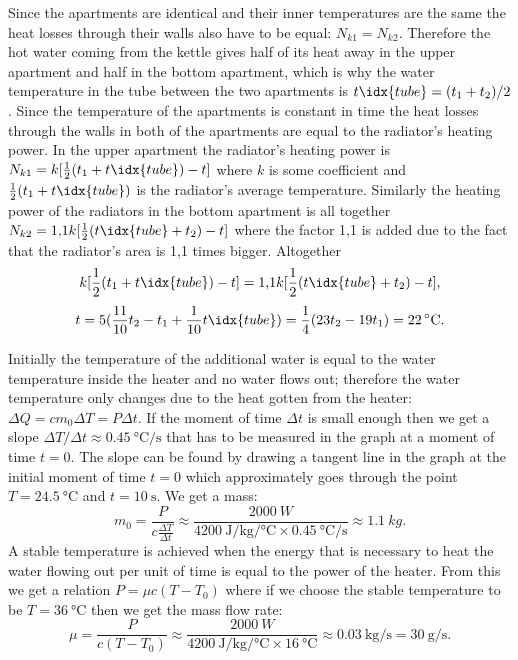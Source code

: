 \documentclass[11pt]{article}
\begin{document}
\solueng
Since the apartments are identical and their inner temperatures are the same the heat losses through their walls also have to be equal: $N_{k1}=N_{k2}$. Therefore the hot water coming from the kettle gives half of its heat away in the upper apartment and half in the bottom apartment, which is why the water temperature in the tube between the two apartments is $t\idx{tube}=(t_1+t_2)/2$. Since the temperature of the apartments is constant in time the heat losses through the walls in both of the apartments are equal to the radiator’s heating power. In the upper apartment the radiator’s heating power is $N_{k1}=k[\frac{1}{2}(t_1+t\idx{tube})-t]$ where $k$ is some coefficient and $\frac{1}{2}(t_1+t\idx{tube})$ is the radiator’s average temperature. Similarly the heating power of the radiators in the bottom apartment is all together $N_{k2}=\text{1,1} k[\frac{1}{2}(t\idx{tube}+t_{2})-t]$ where the factor 1,1 is added due to the fact that the radiator’s area is 1,1 times bigger. Altogether
\[ k[\frac{1}{2}(t_1+t\idx{tube})-t]=\text{1,1}k[\frac{1}{2}(t\idx{tube}+t_{2})-t], \]
\[ t=5 (\frac{11}{10}t_2-t_1+\frac{1}{10}t\idx{tube})=\frac{1}{4}(23t_2-19t_1)=22\,^{\circ}\mathrm{C}. \]
\probend
\bigskip


\solueng
Initially the temperature of the additional water is equal to the water temperature inside the heater and no water flows out; therefore the water temperature only changes due to the heat gotten from the heater: $\Delta Q = c m_0 \Delta T = P \Delta t$. If the moment of time $\Delta t$ is small enough then we get a slope $\Delta T / \Delta t \approx \SI{0,45}{\degreeCelsius\per\second}$ that has to be measured in the graph at a moment of time $t=0$. The slope can be found by drawing a tangent line in the graph at the initial moment of time $t=0$ which approximately goes through the point $T=\SI{24.5}{\degreeCelsius}$ and $t = \SI{10}{\second}$. We get a mass:
$$m_0 = \frac{P}{c \frac{\Delta T}{\Delta t}} \approx \frac{\SI{2000}{W}}{\SI{4200}{\joule \per \kilogram \per \degreeCelsius}\times\SI{0,45}{\degreeCelsius\per\second}} \approx \SI{1.1}{kg}.$$
A stable temperature is achieved when the energy that is necessary to heat the water flowing out per unit of time is equal to the power of the heater. From this we get a relation $P=\mu c(T-T_0)$ where if we choose the stable temperature to be $T=\SI{36}{\degreeCelsius}$ then we get the mass flow rate:
$$\mu = \frac{P}{c(T-T_0)} \approx \frac{\SI{2000}{W}}{\SI{4200}{\joule \per \kilogram \per\degreeCelsius}\times \SI{16}{\degreeCelsius}} \approx \SI{0.03}{\kilogram\per\second}=\SI{30}{\gram\per\second}.$$
\probend
\bigskip
\end{document}
